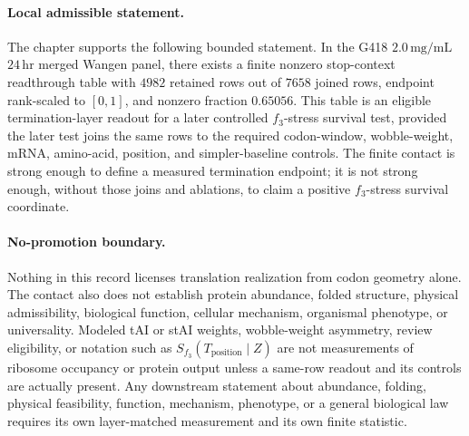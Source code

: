 \paragraph{Local admissible statement.}
The chapter supports the following bounded statement. In the G418 $2.0\,\mathrm{mg}/\mathrm{mL}$ $24\,\mathrm{hr}$ merged Wangen panel, there exists a finite nonzero stop-context readthrough table with $4982$ retained rows out of $7658$ joined rows, endpoint rank-scaled to $[0,1]$, and nonzero fraction $0.65056$. This table is an eligible termination-layer readout for a later controlled $f_3$-stress survival test, provided the later test joins the same rows to the required codon-window, wobble-weight, mRNA, amino-acid, position, and simpler-baseline controls. The finite contact is strong enough to define a measured termination endpoint; it is not strong enough, without those joins and ablations, to claim a positive $f_3$-stress survival coordinate.

\paragraph{No-promotion boundary.}
Nothing in this record licenses translation realization from codon geometry alone. The contact also does not establish protein abundance, folded structure, physical admissibility, biological function, cellular mechanism, organismal phenotype, or universality. Modeled tAI or stAI weights, wobble-weight asymmetry, review eligibility, or notation such as $S_{f_3}(T_{\mathrm{position}}\mid Z)$ are not measurements of ribosome occupancy or protein output unless a same-row readout and its controls are actually present. Any downstream statement about abundance, folding, physical feasibility, function, mechanism, phenotype, or a general biological law requires its own layer-matched measurement and its own finite statistic.